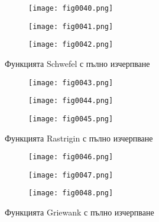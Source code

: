 \begin{figure}[H]
  \begin{subfigure}{0.31\textwidth}
  \texttt{[image: fig0040.png]}
  \label{fig0040}
  \end{subfigure}
  \begin{subfigure}{0.31\textwidth}
  \texttt{[image: fig0041.png]}
  \label{fig0041}
  \end{subfigure}
  \begin{subfigure}{0.31\textwidth}
  \texttt{[image: fig0042.png]}
  \label{fig0042}
  \end{subfigure}
  \caption{Функцията Schwefel с пълно изчерпване}
\end{figure}

\begin{figure}[H]
  \begin{subfigure}{0.31\textwidth}
  \texttt{[image: fig0043.png]}
  \label{fig0043}
  \end{subfigure}
  \begin{subfigure}{0.31\textwidth}
  \texttt{[image: fig0044.png]}
  \label{fig0044}
  \end{subfigure}
  \begin{subfigure}{0.31\textwidth}
  \texttt{[image: fig0045.png]}
  \label{fig0045}
  \end{subfigure}
  \caption{Функцията Rastrigin с пълно изчерпване}
\end{figure}

\begin{figure}[H]
  \begin{subfigure}{0.31\textwidth}
  \texttt{[image: fig0046.png]}
  \label{fig0046}
  \end{subfigure}
  \begin{subfigure}{0.31\textwidth}
  \texttt{[image: fig0047.png]}
  \label{fig0047}
  \end{subfigure}
  \begin{subfigure}{0.31\textwidth}
  \texttt{[image: fig0048.png]}
  \label{fig0048}
  \end{subfigure}
  \caption{Функцията Griewank с пълно изчерпване}
\end{figure}

